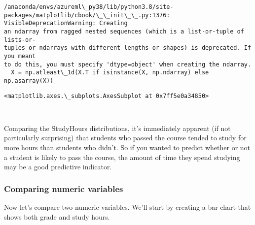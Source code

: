 \documentclass[11pt]{article}
\makeatletter
\newcommand{\boxspacing}{\kern\kvtcb@left@rule\kern\kvtcb@boxsep}
\newcommand{\prompt}[4]{
        {\ttfamily\llap{{\color{#2}[#3]:\hspace{3pt}#4}}\vspace{-\baselineskip}}
    }
\makeatother
\begin{document}
    \begin{Verbatim}[commandchars=\\\{\}]
/anaconda/envs/azureml\_py38/lib/python3.8/site-
packages/matplotlib/cbook/\_\_init\_\_.py:1376: VisibleDeprecationWarning: Creating
an ndarray from ragged nested sequences (which is a list-or-tuple of lists-or-
tuples-or ndarrays with different lengths or shapes) is deprecated. If you meant
to do this, you must specify 'dtype=object' when creating the ndarray.
  X = np.atleast\_1d(X.T if isinstance(X, np.ndarray) else np.asarray(X))
    \end{Verbatim}

            \begin{tcolorbox}[breakable, size=fbox, boxrule=.5pt, pad at break*=1mm, opacityfill=0]
\prompt{Out}{outcolor}{10}{\boxspacing}
\begin{Verbatim}[commandchars=\\\{\}]
<matplotlib.axes.\_subplots.AxesSubplot at 0x7ff5e0a34850>
\end{Verbatim}
\end{tcolorbox}
        
    \begin{center}
    \end{center}
    { \hspace*{\fill} \\}
    
    Comparing the StudyHours distributions, it's immediately apparent (if
not particularly surprising) that students who passed the course tended
to study for more hours than students who didn't. So if you wanted to
predict whether or not a student is likely to pass the course, the
amount of time they spend studying may be a good predictive indicator.

\hypertarget{comparing-numeric-variables}{%
\subsubsection{Comparing numeric
variables}\label{comparing-numeric-variables}}

Now let's compare two numeric variables. We'll start by creating a bar
chart that shows both grade and study hours.
\end{document}
